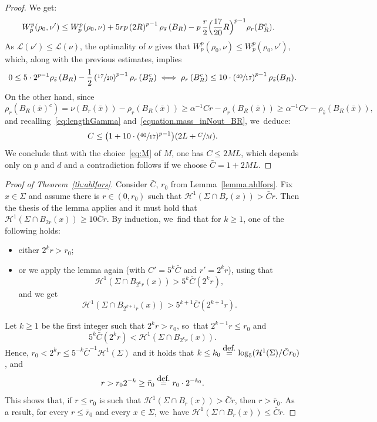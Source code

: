 \documentclass[11pt]{article}
\numberwithin{equation}{section}
\theoremstyle{definition}
\newcommand{\eqdef}{\ensuremath{\stackrel{\mbox{\upshape\tiny def.}}{=}}}
\newcommand\cH{\mathcal{H}}
\begin{document}
\begin{proof}
We get:
\begin{align*}
W_p^p(\rho_0, \nu')
&\le
W_p^p(\rho_0, \nu)
+
5rp
\left(2R\right)^{p-1}\rho_{\bar s}\left(B_R\right)
-
p\,\frac{r}{2}
\Bigl(\frac{17}{20}R\Bigr)^{p-1}\rho_r(B_R^c).
\end{align*}
As $\mathcal{L}(\nu') \le \mathcal{L}(\nu)$, the optimality of $\nu$ gives that $W_p^p(\rho_0, \nu) \le W_p^p(\rho_0, \nu')$, which, along with the previous estimates, implies
\[
0 \le
5\cdot
2^{p-1}\rho_{\bar s}\left(B_R\right)
-
\frac{1}{2}
\left(\sfrac{17}{20}\right)^{p-1}\rho_r\left(B_R^c\right)
\iff
\rho_r\left(B_R^c\right)\le 10\cdot \left(\sfrac{40}{17}\right)^{p-1}
\rho_{\bar s}(B_R).
\]
On the other hand, since
\begin{equation*}
\rho_{r}\left(B_R(\bar x)^c\right) = \nu(B_r(\bar x))- \rho_r(B_R(\bar x)) \ge \alpha^{-1}Cr - \rho_r(B_R(\bar x))
\ge \alpha^{-1}Cr - \rho_{\bar s}(B_R(\bar x)),
\end{equation*}
and recalling~\eqref{eq:lengthGamma} and~\eqref{equation.mass_inNout_BR}, we~deduce:
\[
C
\le \bigl( 1+10\cdot(\sfrac{40}{17})^{p-1} \bigr)(2L+\sfrac{C}{M}).
\]
We conclude that with the choice~\eqref{eq:M} of $M$,
one has $C\le 2M L$, which depends only on $p$ and $d$ and a contradiction follows
if we choose $\bar C=1+2M L$.
\end{proof}

\begin{proof}[Proof of Theorem~\ref{th:ahlfors}]
Consider $\bar C$, $r_0$ from Lemma~\ref{lemma.ahlfors}. Fix $x\in \Sigma$ and assume
there is $r\in (0,r_0)$ such that $\cH^1(\Sigma\cap B_r(x)) > \bar Cr$. Then the thesis of the lemma applies and it must hold that $\cH^1(\Sigma\cap B_{2r}(x)) \ge 10\bar Cr$. By induction, we~find that for $k\ge 1$, one of the following holds:
\begin{itemize}
\item either $2^k r > r_0$;
\item or we apply the lemma again (with $C'=5^k\bar C$ and $r'=2^kr$), using that
\[
\cH^1(\Sigma\cap B_{2^{k}r}(x)) > 5^{k}\bar C(2^k r),
\]
and we get
\[
\cH^1(\Sigma\cap B_{2^{k+1}r}(x)) > 5^{k+1}\bar C(2^{k+1}r).
\]
\end{itemize}

Let $k\ge 1$ be the first integer such that $2^k r> r_0$, so~that $2^{k-1}r\le r_0$
and
\[
5^{k}\bar C(2^{k}r) < \cH^1(\Sigma\cap B_{2^{k}r}(x)).
\]
Hence, $r_0 < 2^kr \le 5^{-k}\bar C^{-1}\cH^1(\Sigma)$ and it holds that $k\le k_0\eqdef \log_5 (\cH^1(\Sigma)/\bar C r_0)$,
and
\[
r > r_0 2^{-k} \ge \bar r_0 \eqdef r_0 \cdot 2^{-k_0}.
\]
This shows that, if $r \le r_0$ is such that $\cH^1(\Sigma\cap B_r(x)) > \bar Cr$, then $r>\bar r_0$. As a result, for every $r\le \bar r_0$ and every $x\in\Sigma$, we~have $\cH^1(\Sigma\cap B_r(x))\le \bar Cr$.
\end{proof}
\end{document}
